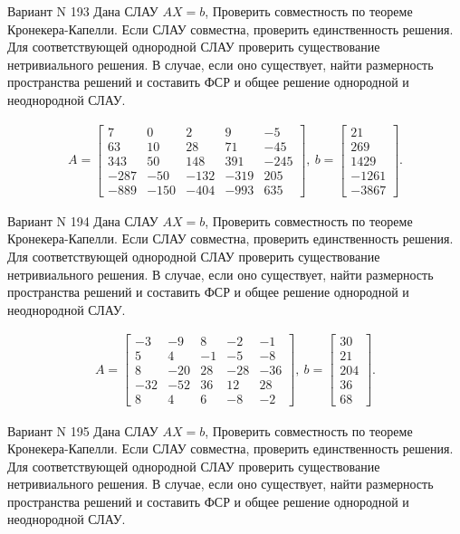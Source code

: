 \documentclass[11pt]{report}
\begin{document}
Вариант N 193
Дана СЛАУ $AX = b$,
Проверить совместность по теореме Кронекера-Капелли. Если СЛАУ совместна, проверить единственность решения.
Для соответствующей однородной СЛАУ проверить существование нетривиального решения. В случае, если оно существует,
найти размерность пространства решений и составить ФСР и общее решение однородной  и неоднородной СЛАУ.


\begin{align*}
 A = \left[\begin{matrix}7 & 0 & 2 & 9 & -5\\63 & 10 & 28 & 71 & -45\\343 & 50 & 148 & 391 & -245\\-287 & -50 & -132 & -319 & 205\\-889 & -150 & -404 & -993 & 635\end{matrix}\right],
\ b = \left[\begin{matrix}21\\269\\1429\\-1261\\-3867\end{matrix}\right]. 
 \end{align*}

Вариант N 194
Дана СЛАУ $AX = b$,
Проверить совместность по теореме Кронекера-Капелли. Если СЛАУ совместна, проверить единственность решения.
Для соответствующей однородной СЛАУ проверить существование нетривиального решения. В случае, если оно существует,
найти размерность пространства решений и составить ФСР и общее решение однородной  и неоднородной СЛАУ.


\begin{align*}
 A = \left[\begin{matrix}-3 & -9 & 8 & -2 & -1\\5 & 4 & -1 & -5 & -8\\8 & -20 & 28 & -28 & -36\\-32 & -52 & 36 & 12 & 28\\8 & 4 & 6 & -8 & -2\end{matrix}\right],
\ b = \left[\begin{matrix}30\\21\\204\\36\\68\end{matrix}\right]. 
 \end{align*}

Вариант N 195
Дана СЛАУ $AX = b$,
Проверить совместность по теореме Кронекера-Капелли. Если СЛАУ совместна, проверить единственность решения.
Для соответствующей однородной СЛАУ проверить существование нетривиального решения. В случае, если оно существует,
найти размерность пространства решений и составить ФСР и общее решение однородной  и неоднородной СЛАУ.
\end{document}
